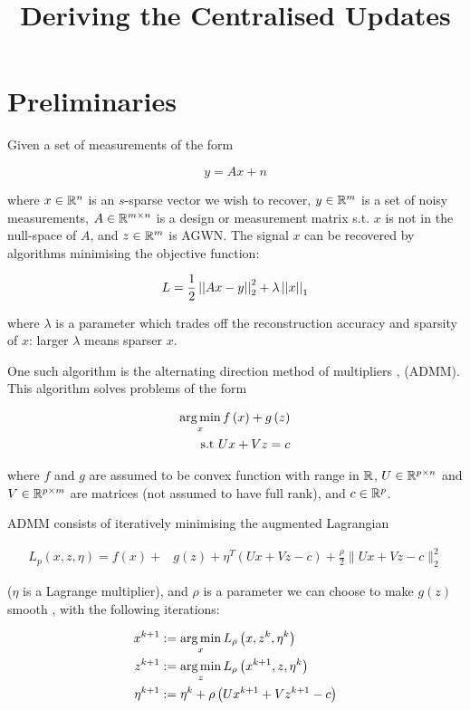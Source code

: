 \documentclass{article}
\title{Deriving the Centralised Updates}
\begin{document}
\section{Preliminaries}

Given a set of measurements of the form

\begin{equation}
y = Ax + n 
\end{equation}

where \(x \in {\mathbb{R}}^n\) is an \(s\)-sparse vector we wish to recover, \(y \in {\mathbb{R}}^m\) is a set of noisy measurements, \(A \in {\mathbb{R}}^{m \times n}\) is a design or measurement matrix s.t. \(x\) is not in the null-space of \(A\), and \(z \in {\mathbb{R}}^m\) is AGWN. The signal \(x\) can be recovered by algorithms minimising the objective function:

\begin{equation}
L = \frac{1}{2} \left|\left|Ax-y\right|\right|_2^2 + \lambda\left|\left|x\right|\right|_1
\label{LASSO}
\end{equation}

where \(\lambda\) is a parameter which trades off the reconstruction accuracy and sparsity of \(x\): larger \(\lambda\) means sparser \(x\). 

One such algorithm is the alternating direction method of multipliers \cite{Boyd2010a}, (ADMM). This algorithm solves problems of the form

\begin{align}
\operatorname*{arg\,min}_{x} f\left( x \right) + g\left(z\right) \nonumber
\\
\text{s.t } Ux +Vz = c
\label{admm}
\end{align}

where \(f\) and \(g\) are assumed to be convex function with range in \({\mathbb{R}}\), \(U \in {\mathbb{R}}^{p \times n}\) and \(V\in {\mathbb{R}}^{p \times m}\) are matrices (not assumed to have full rank), and \(c \in {\mathbb{R}}^p\).

ADMM consists of iteratively minimising the augmented Lagrangian 

\begin{align*}
L_p\left(x, z, \eta\right) = f\left( x\right) +& g\left(z\right)+\eta^T\left(Ux+Vz-c\right) + \frac{\rho}{2}\|Ux+Vz-c\|_2^2
\label{admm_form}
\end{align*}

(\(\eta\) is a Lagrange multiplier), and \(\rho\) is a parameter we can choose to make \(g(z)\) smooth \cite{nesterov2005smooth}, with the following iterations:

\begin{align}
x^{k+1} &:= \operatorname*{arg\,min}_{x} L_\rho\left(x,z^k,\eta^k\right)\\
z^{k+1} &:= \operatorname*{arg\,min}_{z} L_\rho\left(x^{k+1},z,\eta^k\right)\\
\eta^{k+1} &:= \eta^{k} + \rho \left(Ux^{k+1} + Vz^{k+1} - c\right)
\label{admm_algo}
\end{align}
\end{document}
